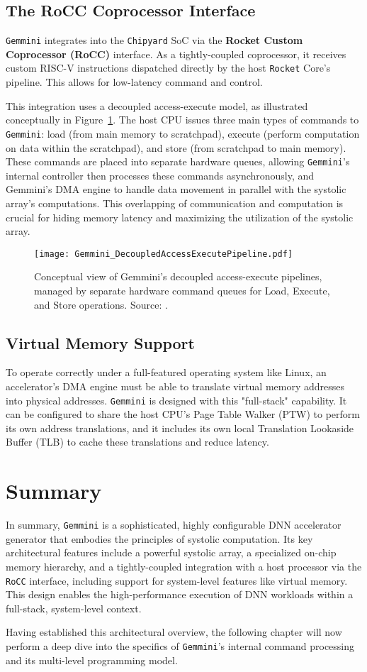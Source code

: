 \subsection{The RoCC Coprocessor Interface}
\texttt{Gemmini} integrates into the \texttt{Chipyard} SoC via the \textbf{Rocket Custom Coprocessor (RoCC)} interface. As a tightly-coupled coprocessor, it receives custom RISC-V instructions dispatched directly by the host \texttt{Rocket} Core's pipeline. This allows for low-latency command and control.



This integration uses a decoupled access-execute model, as illustrated conceptually in Figure~\ref{fig:decoupled_pipelines}. The host CPU issues three main types of commands to \texttt{Gemmini}: load (from main memory to scratchpad), execute (perform computation on data within the scratchpad), and store (from scratchpad to main memory). These commands are placed into separate hardware queues, allowing \texttt{Gemmini}'s internal controller then processes these commands asynchronously, and Gemmini's DMA engine to handle data movement in parallel with the systolic array's computations. This overlapping of communication and computation is crucial for hiding memory latency and maximizing the utilization of the systolic array.

\begin{figure}[htbp]
    \centering
    \texttt{[image: Gemmini\_DecoupledAccessExecutePipeline.pdf]}
    \caption{Conceptual view of Gemmini's decoupled access-execute pipelines, managed by separate hardware command queues for Load, Execute, and Store operations. Source: \cite{gemini-dac}.}
    \label{fig:decoupled_pipelines}
\end{figure}

\subsection{Virtual Memory Support}
To operate correctly under a full-featured operating system like Linux, an accelerator's DMA engine must be able to translate virtual memory addresses into physical addresses. \texttt{Gemmini} is designed with this "full-stack" capability. It can be configured to share the host CPU's Page Table Walker (PTW) to perform its own address translations, and it includes its own local Translation Lookaside Buffer (TLB) to cache these translations and reduce latency.

\section{Summary}
\label{sec:gemmini_overview_summary}
In summary, \texttt{Gemmini} is a sophisticated, highly configurable DNN accelerator generator that embodies the principles of systolic computation. Its key architectural features include a powerful systolic array, a specialized on-chip memory hierarchy, and a tightly-coupled integration with a host processor via the \texttt{RoCC} interface, including support for system-level features like virtual memory. This design enables the high-performance execution of DNN workloads within a full-stack, system-level context. 

Having established this architectural overview, the following chapter will now perform a deep dive into the specifics of \texttt{Gemmini}'s internal command processing and its multi-level programming model.